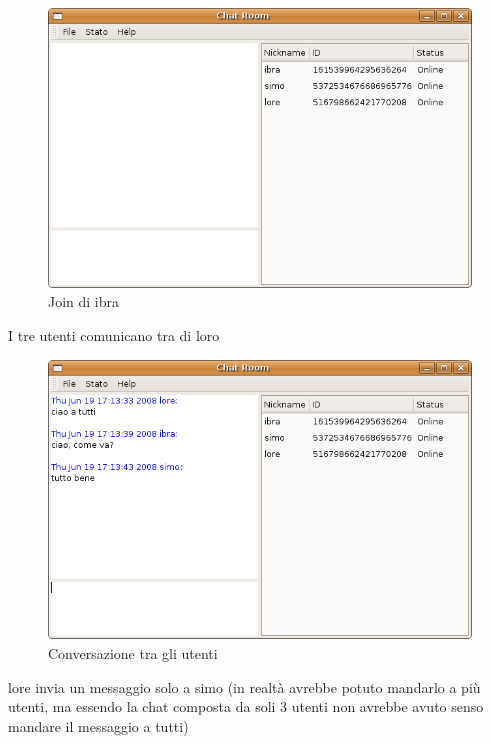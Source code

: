 \begin{figure}[H]
\begin{center}
\includegraphics[scale=0.5]{etc/join2.png}
\caption{Join di ibra}
\label{join2}
\end{center}
\end{figure}
I tre utenti comunicano tra di loro
\begin{figure}[H]
\begin{center}
\includegraphics[scale=0.5]{etc/conversazione_chat.png}
\caption{Conversazione tra gli utenti}
\label{conversazionechat}
\end{center}
\end{figure}
lore invia un messaggio solo a simo (in realtà avrebbe potuto mandarlo a più utenti, ma essendo la chat composta da soli 3 utenti non avrebbe avuto senso mandare il messaggio a tutti)
